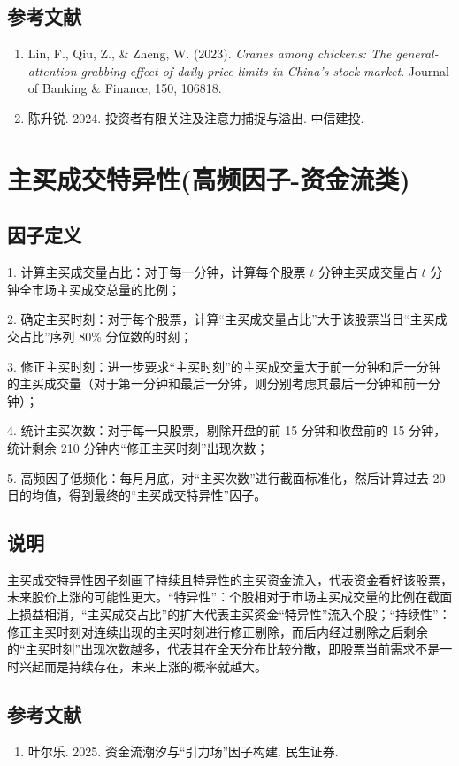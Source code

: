 \documentclass{article}
\begin{document}
\subsection{参考文献}
\begin{enumerate}
    \item Lin, F., Qiu, Z., \& Zheng, W. (2023). \textit{Cranes among chickens: The general-attention-grabbing effect of daily price limits in China's stock market}. Journal of Banking \& Finance, 150, 106818.
    \item 陈升锐. 2024. 投资者有限关注及注意力捕捉与溢出. 中信建投.
\end{enumerate}

\section{主买成交特异性(高频因子-资金流类)}

\subsection{因子定义}

1. 计算主买成交量占比：对于每一分钟，计算每个股票 \( t \) 分钟主买成交量占 \( t \) 分钟全市场主买成交总量的比例；

2. 确定主买时刻：对于每个股票，计算“主买成交量占比”大于该股票当日“主买成交占比”序列 80\% 分位数的时刻；

3. 修正主买时刻：进一步要求“主买时刻”的主买成交量大于前一分钟和后一分钟的主买成交量（对于第一分钟和最后一分钟，则分别考虑其最后一分钟和前一分钟）；

4. 统计主买次数：对于每一只股票，剔除开盘的前 15 分钟和收盘前的 15 分钟，统计剩余 210 分钟内“修正主买时刻”出现次数；

5. 高频因子低频化：每月月底，对“主买次数”进行截面标准化，然后计算过去 20 日的均值，得到最终的“主买成交特异性”因子。

\subsection{说明}
主买成交特异性因子刻画了持续且特异性的主买资金流入，代表资金看好该股票，未来股价上涨的可能性更大。“特异性”：个股相对于市场主买成交量的比例在截面上损益相消，“主买成交占比”的扩大代表主买资金“特异性”流入个股；“持续性”：修正主买时刻对连续出现的主买时刻进行修正剔除，而后内经过剔除之后剩余的“主买时刻”出现次数越多，代表其在全天分布比较分散，即股票当前需求不是一时兴起而是持续存在，未来上涨的概率就越大。

\subsection{参考文献}
\begin{enumerate}
    \item 叶尔乐. 2025. 资金流潮汐与“引力场”因子构建. 民生证券.
\end{enumerate}
\end{document}
